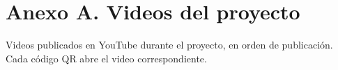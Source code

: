 \chapter*{Anexo A. Videos del proyecto}

Videos publicados en YouTube durante el proyecto, en orden de publicación. Cada
código QR abre el video correspondiente.

